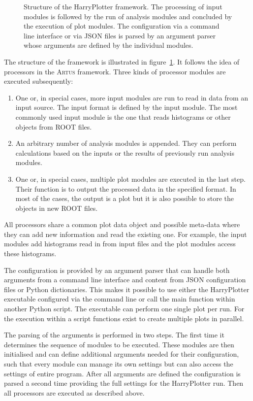 \documentclass[3p]{elsarticle}
\newcommand{\software}[1]{\textsc{#1}\xspace}
\newcommand{\artus}{\software{Artus}}
\begin{document}
\begin{figure}[htb]
\centering 
\caption{Structure of the HarryPlotter framework. The processing of input modules is followed by the run of analysis modules and concluded by the execution of plot modules. The configuration via a command line interface or via JSON files is parsed by an argument parser whose arguments are defined by the individual modules.}
\label{figure_artus_harry_plotter}
\end{figure}

The structure of the framework is illustrated in figure~\ref{figure_artus_harry_plotter}. It follows the idea of processors in the \artus framework. Three kinds of processor modules are executed subsequently:
\begin{enumerate}
\item One or, in special cases, more input modules are run to read in data from an input source. The input format is defined by the input module. The most commonly used input module is the one that reads histograms or other objects from ROOT files.
\item An arbitrary number of analysis modules is appended. They can perform calculations based on the inputs or the results of previously run analysis modules.
\item One or, in special cases, multiple plot modules are executed in the last step. Their function is to output the processed data in the specified format. In most of the cases, the output is a plot but it is also possible to store the objects in new ROOT files.
\end{enumerate}
All processors share a common plot data object and possible meta-data where they can add new information and read the existing one. For example, the input modules add histograms read in from input files and the plot modules access these histograms.

The configuration is provided by an argument parser that can handle both arguments from a command line interface and content from JSON configuration files or Python dictionaries. This makes it possible to use either the HarryPlotter executable configured via the command line or call the main function within another Python script. The executable can perform one single plot per run. For the execution within a script functions exist to create multiple plots in parallel.

The parsing of the arguments is performed in two steps. The first time it determines the sequence of modules to be executed. These modules are then initialised and can define additional arguments needed for their configuration, such that every module can manage its own settings but can also access the settings of entire program. After all arguments are defined the configuration is parsed a second time providing the full settings for the HarryPlotter run. Then all processors are executed as described above.
\end{document}
